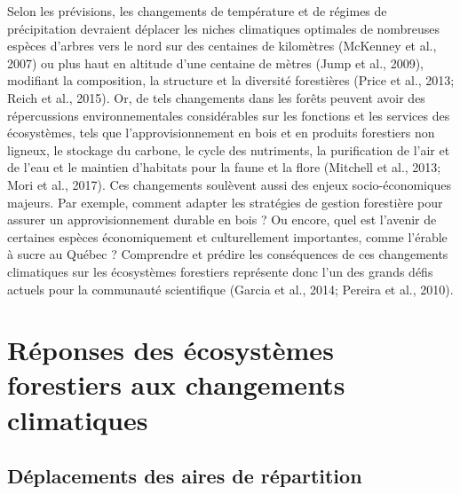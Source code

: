 \documentclass[
]{article}
\begin{document}
Selon les prévisions, les changements de température et de régimes de
précipitation devraient déplacer les niches climatiques optimales de
nombreuses espèces d'arbres vers le nord sur des centaines de kilomètres
(McKenney et al., 2007) ou plus haut en altitude d'une centaine de
mètres (Jump et al., 2009), modifiant la composition, la structure et la
diversité forestières (Price et al., 2013; Reich et al., 2015). Or, de
tels changements dans les forêts peuvent avoir des répercussions
environnementales considérables sur les fonctions et les services des
écosystèmes, tels que l'approvisionnement en bois et en produits
forestiers non ligneux, le stockage du carbone, le cycle des nutriments,
la purification de l'air et de l'eau et le maintien d'habitats pour la
faune et la flore (Mitchell et al., 2013; Mori et al., 2017). Ces
changements soulèvent aussi des enjeux socio-économiques majeurs. Par
exemple, comment adapter les stratégies de gestion forestière pour
assurer un approvisionnement durable en bois ? Ou encore, quel est
l'avenir de certaines espèces économiquement et culturellement
importantes, comme l'érable à sucre au Québec ? Comprendre et prédire
les conséquences de ces changements climatiques sur les écosystèmes
forestiers représente donc l'un des grands défis actuels pour la
communauté scientifique (Garcia et al., 2014; Pereira et al., 2010).

\hypertarget{ruxe9ponses-des-uxe9cosystuxe8mes-forestiers-aux-changements-climatiques}{%
\section{Réponses des écosystèmes forestiers aux changements
climatiques}\label{ruxe9ponses-des-uxe9cosystuxe8mes-forestiers-aux-changements-climatiques}}

\hypertarget{duxe9placements-des-aires-de-ruxe9partition}{%
\subsection{Déplacements des aires de
répartition}\label{duxe9placements-des-aires-de-ruxe9partition}}
\end{document}
